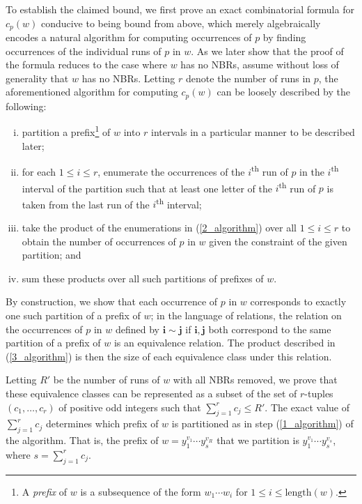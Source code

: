 \documentclass[11pt]{amsart}
\begin{document}
To establish the claimed bound, we first prove an exact combinatorial formula for $c_p(w)$ conducive to being bound from above, which merely algebraically encodes a natural algorithm for computing occurrences of $p$ by finding occurrences of the individual runs of $p$ in $w$. As we later show that the proof of the formula reduces to the case where $w$ has no NBRs, assume without loss of generality that $w$ has no NBRs. Letting $r$ denote the number of runs in $p$, the aforementioned algorithm for computing $c_p(w)$ can be loosely described by the following:
\begin{enumerate}[(i)]
    \item\label{1_algorithm} partition a prefix\footnote{A \emph{prefix} of $w$ is a subsequence of the form $w_1\cdots w_i$ for $1\leq i\leq \text{length}(w)$.} of $w$ into $r$ intervals in a particular manner to be described later;
    \item\label{2_algorithm} for each $1\leq i\leq r$, enumerate the occurrences of the $i$\textsuperscript{th} run of $p$ in the $i$\textsuperscript{th} interval of the partition such that at least one letter of the $i$\textsuperscript{th} run of $p$ is taken from the last run of the $i$\textsuperscript{th} interval;
    \item\label{3_algorithm} take the product of the enumerations in (\ref{2_algorithm}) over all $1\leq i\leq r$ to obtain the number of occurrences of $p$ in $w$ given the constraint of the given partition; and
    \item\label{4_algorithm} sum these products over all such partitions of prefixes of $w$.
\end{enumerate}

By construction, we show that each occurrence of $p$ in $w$ corresponds to exactly one such partition of a prefix of $w$; in the language of relations, the relation on the occurrences of $p$ in $w$ defined by $\mathbf{i}\sim\mathbf{j}$ if $\mathbf{i},\mathbf{j}$ both correspond to the same partition of a prefix of $w$ is an equivalence relation. The product described in (\ref{3_algorithm}) is then the size of each equivalence class under this relation.

Letting $R'$ be the number of runs of $w$ with all NBRs removed, we prove that these equivalence classes can be represented as a subset of the set of $r$-tuples $(c_1,\dots,c_r)$ of positive odd integers such that $\sum_{j=1}^{r}c_j\leq R'$. The exact value of $\sum_{j=1}^{r}c_j$ determines which prefix of $w$ is partitioned as in step (\ref{1_algorithm}) of the algorithm. That is, the prefix of $w=y_1^{v_1}\cdots y_s^{v_R}$ that we partition is $y_1^{v_1}\cdots y_s^{v_s}$, where $s=\sum_{j=1}^{r}c_j$.
\end{document}
